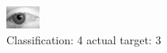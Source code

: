 \begin{figure}[h!]
\begin{center}
\includegraphics[width=0.60\columnwidth]{figures/ID2842_class_4_target_3.png}
\end{center}
\caption{ Classification: 4 actual target: 3}
\label{fig:ID2842_class_4_target_3}
\end{figure}
